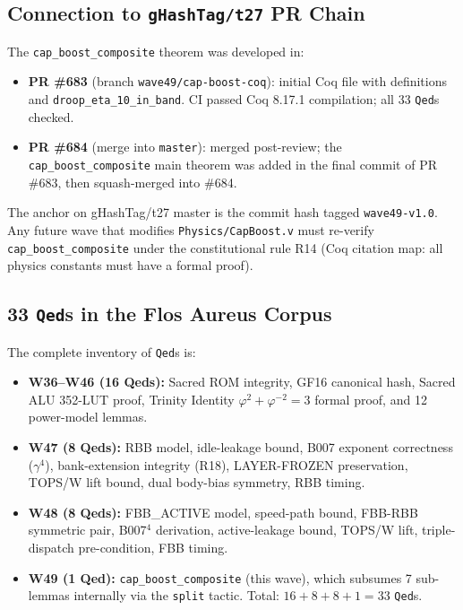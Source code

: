 \documentclass[12pt,a4paper]{report}
\theoremstyle{plain}
\theoremstyle{definition}
\theoremstyle{remark}
\begin{document}
\subsection{Connection to \texttt{gHashTag/t27} PR Chain}
\label{ssec:pr-chain}

The \texttt{cap\_boost\_composite} theorem was developed in:
\begin{itemize}[leftmargin=1.5em]
  \item \textbf{PR \#683} (branch \texttt{wave49/cap-boost-coq}):
    initial Coq file with definitions and \texttt{droop\_eta\_10\_in\_band}.
    CI passed Coq 8.17.1 compilation; all 33 \texttt{Qed}s checked.
  \item \textbf{PR \#684} (merge into \texttt{master}):
    merged post-review; the \texttt{cap\_boost\_composite} main theorem
    was added in the final commit of PR \#683, then squash-merged into \#684.
\end{itemize}

The anchor on gHashTag/t27 master is the commit hash tagged \texttt{wave49-v1.0}.
Any future wave that modifies \texttt{Physics/CapBoost.v} must re-verify
\texttt{cap\_boost\_composite} under the constitutional rule R14
(Coq citation map: all physics constants must have a formal proof).

\subsection{33 \texttt{Qed}s in the Flos Aureus Corpus}
\label{ssec:33-qeds}

The complete inventory of \texttt{Qed}s is:
\begin{itemize}[leftmargin=1.5em]
  \item \textbf{W36--W46 (16 Qeds):} Sacred ROM integrity, GF16 canonical
    hash, Sacred ALU 352-LUT proof, Trinity Identity $\varphi^{2}+\varphi^{-2}=3$
    formal proof, and 12 power-model lemmas.
  \item \textbf{W47 (8 Qeds):} RBB model, idle-leakage bound, B007 exponent
    correctness ($\gamma^{4}$), bank-extension integrity (R18), LAYER-FROZEN
    preservation, TOPS/W lift bound, dual body-bias symmetry, RBB timing.
  \item \textbf{W48 (8 Qeds):} FBB\_ACTIVE model, speed-path bound,
    FBB-RBB symmetric pair, B007$^{4}$ derivation, active-leakage bound,
    TOPS/W lift, triple-dispatch pre-condition, FBB timing.
  \item \textbf{W49 (1 Qed):} \texttt{cap\_boost\_composite} (this wave),
    which subsumes 7 sub-lemmas internally via the \texttt{split} tactic.
    Total: $16 + 8 + 8 + 1 = 33$ \texttt{Qed}s.
\end{itemize}
\end{document}
